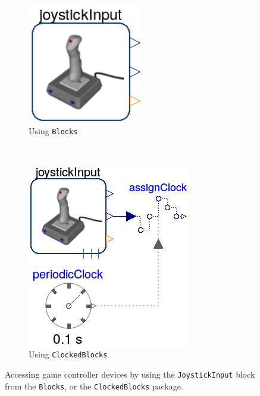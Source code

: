 \documentclass{resources/modelica}
\newcommand{\modelica}[1]{\lstinline[language=modelica]|#1|}
\begin{document}
\begin{figure}[tb]
  \centering
  \begin{subfigure}[b]{0.45\columnwidth}
     \centering
     \includegraphics[width=0.55\textwidth]{figures/MDDJoystick}
     \caption{Using \modelica{Blocks}}
     \label{fig:MDDJoystick}
  \end{subfigure}%
  ~ %
  \begin{subfigure}[b]{0.45\columnwidth}
          \includegraphics[width=\textwidth]{figures/MDDJoystickClocked}
          \caption{Using \modelica{ClockedBlocks}}
          \label{fig:MDDJoystickClocked}
  \end{subfigure}
  \caption{Accessing game controller devices by using the
  \modelica{JoystickInput} block from the \modelica{Blocks}, or the
  \modelica{ClockedBlocks} package.}
  \label{fig:JoystickBlocks}
\end{figure}
\end{document}
